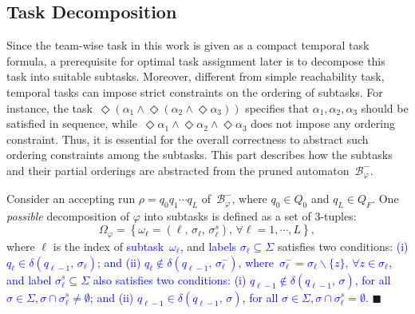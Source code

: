 \subsection{Task Decomposition}\label{subsubsec:task-decompose}
Since the team-wise task in this work is given as a compact temporal task formula,
a prerequisite for optimal task assignment later is to decompose this task into suitable subtasks.
Moreover, different from simple reachability task,
temporal tasks can impose strict constraints on the ordering of subtasks.
For instance, the task~$\Diamond (\alpha_1 \land \Diamond (\alpha_2 \land \Diamond\alpha_3)) $
specifies that $\alpha_1,\alpha_2,\alpha_3$ should be satisfied in sequence,
while~$\Diamond\alpha_1\land\Diamond\alpha_2\land\Diamond\alpha_3$ does not impose any ordering constraint.
Thus, it is essential for the overall correctness to abstract such ordering constraints among the subtasks.
This part describes how the subtasks and their partial orderings are abstracted from the pruned automaton~$\mathcal{B}_{\varphi}^{-}$.

\begin{definition} \label{def:subtasks}
Consider an accepting run $\rho=q_0q_1\cdots q_L$ of~$\mathcal{B}_{\varphi}^{-}$,
where $q_0\in Q_0$ and $q_L\in Q_F$.
One \emph{possible} decomposition of $\varphi$ into subtasks is defined
as a set of 3-tuples:
\begin{equation}\label{eq:subtask}
\Omega_{\varphi} = \left\{\omega_\ell=(\ell,\, \sigma_\ell,\, \sigma^{s}_\ell),\, \forall \ell=1,\cdots,L\right\},
\end{equation}
where $\ell$ is the index of \textcolor{blue}{subtask~$\omega_\ell$},
and \textcolor{blue}{labels $\sigma_\ell\subseteq \Sigma$} satisfies two conditions:
\textcolor{blue}{(i) $q_{\ell} \in \delta(q_{\ell-1},\,\sigma_\ell)$;
and (ii) $q_{\ell} \notin \delta(q_{\ell-1},\,\sigma^-_\ell)$, where~$\sigma^-_\ell =  \sigma_\ell \backslash \{z\}$, $\forall z\in \sigma_\ell$,
and label $\sigma^{s}_\ell\subseteq \Sigma$ also satisfies two conditions:
(i) $q_{\ell-1} \notin \delta(q_{\ell-1},\,\sigma)$, for all $\sigma\in\Sigma, \sigma\cap\sigma^{s}_\ell\neq\emptyset$;
and (ii) $q_{\ell-1} \in \delta(q_{\ell-1},\,\sigma)$, for all  $\sigma\in\Sigma, \sigma\cap\sigma^{s}_\ell=\emptyset$.}
\hfill $\blacksquare$
\end{definition}

